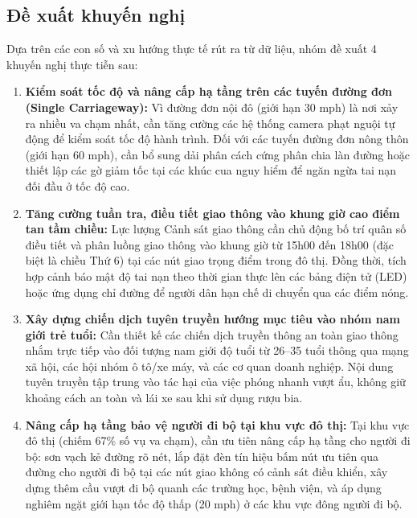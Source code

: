 \subsection{Đề xuất khuyến nghị}

Dựa trên các con số và xu hướng thực tế rút ra từ dữ liệu, nhóm đề xuất 4 khuyến nghị thực tiễn sau:

\begin{enumerate}
    \item \textbf{Kiểm soát tốc độ và nâng cấp hạ tầng trên các tuyến đường đơn (Single Carriageway):}
    Vì đường đơn nội đô (giới hạn 30 mph) là nơi xảy ra nhiều va chạm nhất, cần tăng cường các hệ thống camera phạt nguội tự động để kiểm soát tốc độ hành trình. Đối với các tuyến đường đơn nông thôn (giới hạn 60 mph), cần bổ sung dải phân cách cứng phân chia làn đường hoặc thiết lập các gờ giảm tốc tại các khúc cua nguy hiểm để ngăn ngừa tai nạn đối đầu ở tốc độ cao.
    
    \item \textbf{Tăng cường tuần tra, điều tiết giao thông vào khung giờ cao điểm tan tầm chiều:}
    Lực lượng Cảnh sát giao thông cần chủ động bố trí quân số điều tiết và phân luồng giao thông vào khung giờ từ 15h00 đến 18h00 (đặc biệt là chiều Thứ 6) tại các nút giao trọng điểm trong đô thị. Đồng thời, tích hợp cảnh báo mật độ tai nạn theo thời gian thực lên các bảng điện tử (LED) hoặc ứng dụng chỉ đường để người dân hạn chế di chuyển qua các điểm nóng.
    
    \item \textbf{Xây dựng chiến dịch tuyên truyền hướng mục tiêu vào nhóm nam giới trẻ tuổi:}
    Cần thiết kế các chiến dịch truyền thông an toàn giao thông nhắm trực tiếp vào đối tượng nam giới độ tuổi từ 26--35 tuổi thông qua mạng xã hội, các hội nhóm ô tô/xe máy, và các cơ quan doanh nghiệp. Nội dung tuyên truyền tập trung vào tác hại của việc phóng nhanh vượt ẩu, không giữ khoảng cách an toàn và lái xe sau khi sử dụng rượu bia.
    
    \item \textbf{Nâng cấp hạ tầng bảo vệ người đi bộ tại khu vực đô thị:}
    Tại khu vực đô thị (chiếm 67\% số vụ va chạm), cần ưu tiên nâng cấp hạ tầng cho người đi bộ: sơn vạch kẻ đường rõ nét, lắp đặt đèn tín hiệu bấm nút ưu tiên qua đường cho người đi bộ tại các nút giao không có cảnh sát điều khiển, xây dựng thêm cầu vượt đi bộ quanh các trường học, bệnh viện, và áp dụng nghiêm ngặt giới hạn tốc độ thấp (20 mph) ở các khu vực đông người đi bộ.
\end{enumerate}

